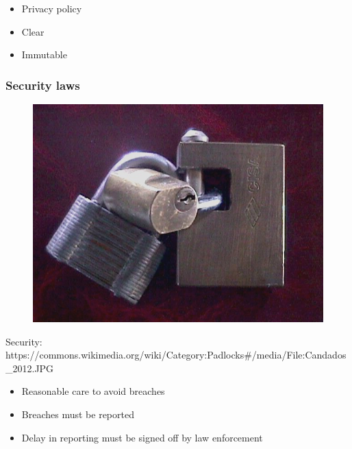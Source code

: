 \begin{itemize}
\item Privacy policy
\item Clear
\item Immutable
\end{itemize}


\begin{frame}[fragile]
\frametitle{Security laws}


\begin{figure}
\includegraphics{security}
\end{figure}

\end{frame}

Security: https://commons.wikimedia.org/wiki/Category:Padlocks#/media/File:Candados_2012.JPG

\begin{itemize}
\item Reasonable care to avoid breaches
\item Breaches must be reported
\item Delay in reporting must be signed off by law enforcement
\end{itemize}

